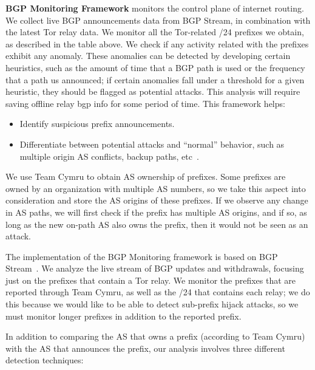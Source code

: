 {\bf BGP Monitoring Framework} monitors the control plane of internet routing. We collect live BGP announcements data from BGP Stream, in combination with the latest Tor relay data. We monitor all the Tor-related /24 prefixes we obtain, as described in the table above. We check if any activity related with the prefixes exhibit any anomaly. These anomalies can be detected by developing certain heuristics, such as the amount of time that a BGP path is used or the frequency that a path us announced; if certain anomalies fall under a threshold for a given heuristic, they should be flagged as potential attacks. This analysis will require saving offline relay bgp info for some period of time.  This framework helps:

\begin{itemize}
\item Identify suspicious prefix announcements.
\item Differentiate between potential attacks and ``normal'' behavior, such as multiple origin AS conflicts, backup paths, etc~\cite{zhao2001analysis}.
\end{itemize}

We use Team Cymru to obtain AS ownership of prefixes. Some prefixes are owned by an organization with multiple AS numbers, so we take this aspect into consideration and store the AS origins of these prefixes. If we observe any change in AS paths, we will first check if the prefix has multiple AS origins, and if so, as long as the new on-path AS also owns the prefix, then it would not be seen as an attack. 

The implementation of the BGP Monitoring framework is based on BGP Stream~\cite{bgpstream}.  We analyze the live stream of BGP updates and withdrawals, focusing just on the prefixes that contain a Tor relay.  We monitor the prefixes that are reported through Team Cymru, as well as the /24 that contains each relay; we do this because we would like to be able to detect sub-prefix hijack attacks, so we must monitor longer prefixes in addition to the reported prefix.  

In addition to comparing the AS that owns a prefix (according to Team Cymru) with the AS that announces the prefix, our analysis involves three different detection techniques:

